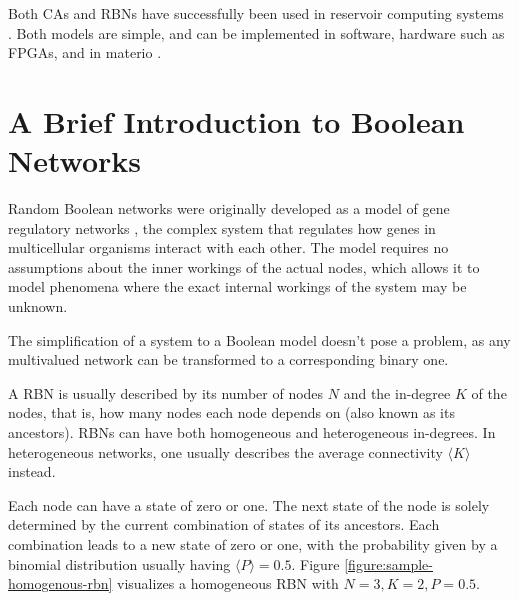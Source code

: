 Both CAs and RBNs have successfully been used in reservoir computing systems \cite{yilmaz2014reservoir} \cite{rbn-reservoir}.
Both models are simple, and can be implemented in software,
hardware such as FPGAs, and in materio \cite{miller2002evolution} \cite{farstad2015evolving}.

\section{A Brief Introduction to Boolean Networks}
\label{section:rbns}

Random Boolean networks were originally developed as a model of gene regulatory networks \cite{kauffman1969metabolic},
the complex system that regulates how genes in multicellular organisms interact with each other.
The model requires no assumptions about the inner workings of the actual nodes,
which allows it to model phenomena where the exact internal workings of the system may be unknown.

The simplification of a system to a Boolean model doesn't pose a problem,
as any multivalued network can be transformed to a corresponding binary one.

A RBN is usually described by its number of nodes $N$ and the in-degree $K$ of the nodes,
that is, how many nodes each node depends on (also known as its ancestors).
RBNs can have both homogeneous and heterogeneous in-degrees.
In heterogeneous networks, one usually describes the average connectivity $\langle K \rangle$ instead.

Each node can have a state of zero or one.
The next state of the node is solely determined by the current combination of states of its ancestors.
Each combination leads to a new state of zero or one,
with the probability given by a binomial distribution usually having $\langle P \rangle = 0.5$.
Figure \ref{figure:sample-homogenous-rbn} visualizes a homogeneous RBN with $N=3, K=2, P=0.5$.


